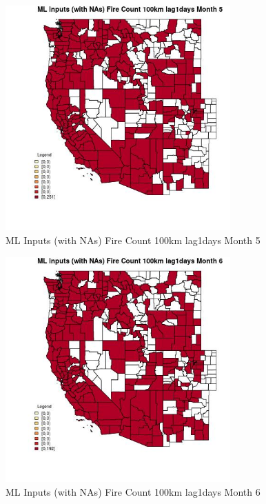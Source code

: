 \begin{figure} 
\centering  
\includegraphics[width=0.77\textwidth]{Code_Outputs/Report_ML_input_PM25_Step4_part_e_de_duplicated_aves_compiled_2019-05-21wNAs_CountyFire_Count_100km_lag1daysmedianMonth5.jpg} 
\caption{\label{fig:Report_ML_input_PM25_Step4_part_e_de_duplicated_aves_compiled_2019-05-21wNAsCountyFire_Count_100km_lag1daysmedianMonth5}ML Inputs (with NAs) Fire Count 100km lag1days Month 5} 
\end{figure} 
 

\begin{figure} 
\centering  
\includegraphics[width=0.77\textwidth]{Code_Outputs/Report_ML_input_PM25_Step4_part_e_de_duplicated_aves_compiled_2019-05-21wNAs_CountyFire_Count_100km_lag1daysmedianMonth6.jpg} 
\caption{\label{fig:Report_ML_input_PM25_Step4_part_e_de_duplicated_aves_compiled_2019-05-21wNAsCountyFire_Count_100km_lag1daysmedianMonth6}ML Inputs (with NAs) Fire Count 100km lag1days Month 6} 
\end{figure} 
 

